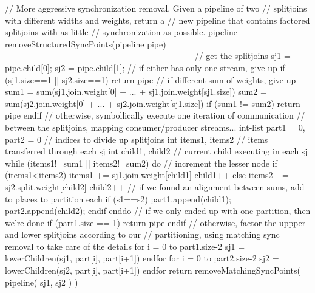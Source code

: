 // More aggressive synchronization removal.  Given a pipeline of two
// splitjoins with different widths and weights, return a
// new pipeline that contains factored splitjoins with as little
// synchronization as possible.
pipeline removeStructuredSyncPoints(pipeline pipe)
------------------------------------------------------------------
// get the splitjoins
sj1 = pipe.child[0];
sj2 = pipe.child[1];
// if either has only one stream, give up
if (sj1.size==1 || sj2.size==1) return pipe
// if different sum of weights, give up
sum1 = sum(sj1.join.weight[0] + ... + sj1.join.weight[sj1.size])
sum2 = sum(sj2.join.weight[0] + ... + sj2.join.weight[sj1.size])
if (sum1 != sum2)
 return pipe
endif
// otherwise, symbollically execute one iteration of communication
// between the splitjoins, mapping consumer/producer streams...
int-list part1 = {0}, part2 = {0}  // indices to divide up splitjoins
int items1, items2                 // items transferred through each sj
int child1, child2                 // current child executing in each sj
while (items1!=sum1 || items2!=sum2) do
  // increment the lesser node
  if (items1<items2) {
    items1 += sj1.join.weight[child1]
    child1++
  } else {
    items2 += sj2.split.weight[child2]
    child2++
  }
  // if we found an alignment between sums, add to places to partition each
  if (s1==s2)
    part1.append(child1);
    part2.append(child2);
  endif
enddo
// if we only ended up with one partition, then we're done
if (part1.size == 1)
  return pipe
endif
// otherwise, factor the uppper and lower splitjoins according to our 
// partitioning, using matching sync removal to take care of the details
for i = 0 to part1.size-2
  sj1 = lowerChildren(sj1, part[i], part[i+1])
endfor
for i = 0 to part2.size-2
  sj2 = lowerChildren(sj2, part[i], part[i+1])
endfor
return removeMatchingSyncPoints( pipeline( sj1, sj2 ) )